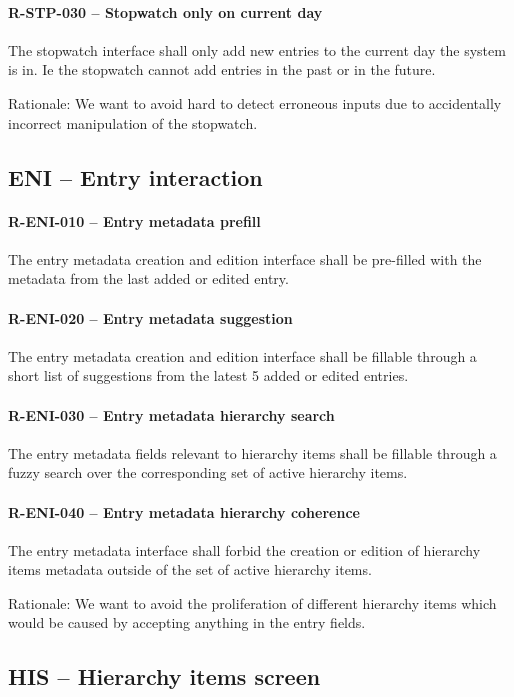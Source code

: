 \paragraph{R-STP-030 -- Stopwatch only on current day}
The stopwatch interface shall only add new entries to the current day
the system is in. Ie the stopwatch cannot add entries in the past or in
the future.

Rationale: We want to avoid hard to detect erroneous inputs due to
accidentally incorrect manipulation of the stopwatch.

\subsection{ENI -- Entry interaction}
\paragraph{R-ENI-010 -- Entry metadata prefill}
The entry metadata creation and edition interface shall be pre-filled with
the metadata from the last added or edited entry.

\paragraph{R-ENI-020 -- Entry metadata suggestion}
The entry metadata creation and edition interface shall be fillable through
a short list of suggestions from the latest 5 added or edited entries.

\paragraph{R-ENI-030 -- Entry metadata hierarchy search}
The entry metadata fields relevant to hierarchy items shall be fillable
through a fuzzy search over the corresponding set of active hierarchy items.

\paragraph{R-ENI-040 -- Entry metadata hierarchy coherence}
The entry metadata interface shall forbid the creation or edition of
hierarchy items metadata outside of the set of active hierarchy items.

Rationale: We want to avoid the proliferation of different hierarchy items which
would be caused by accepting anything in the entry fields.

\subsection{HIS -- Hierarchy items screen}
